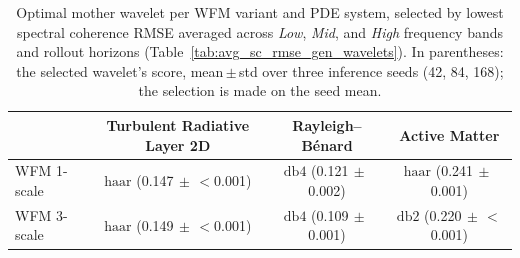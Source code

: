\begin{table}[ht]
\centering
\caption{Optimal mother wavelet per WFM variant and PDE system, selected by lowest spectral coherence RMSE averaged across \textit{Low}, \textit{Mid}, and \textit{High} frequency bands and rollout horizons (Table~\ref{tab:avg_sc_rmse_gen_wavelets}). In parentheses: the selected wavelet's score, mean\,$\pm$\,std over three inference seeds (42, 84, 168); the selection is made on the seed mean.}
\label{si-tab:optimal_wavelets}
\begin{tabular}{lccc}
\toprule
 & Turbulent Radiative Layer 2D & Rayleigh--B\'{e}nard & Active Matter \\
\midrule
WFM 1-scale & $\mathrm{haar}$ (0.147{\scriptsize$\,\pm\,$$<$0.001}) & $\mathrm{db}4$ (0.121{\scriptsize$\,\pm\,$0.002}) & $\mathrm{haar}$ (0.241{\scriptsize$\,\pm\,$0.001}) \\
WFM 3-scale & $\mathrm{haar}$ (0.149{\scriptsize$\,\pm\,$$<$0.001}) & $\mathrm{db}4$ (0.109{\scriptsize$\,\pm\,$0.001}) & $\mathrm{db}2$ (0.220{\scriptsize$\,\pm\,$$<$0.001}) \\
\bottomrule
\end{tabular}
\end{table}
